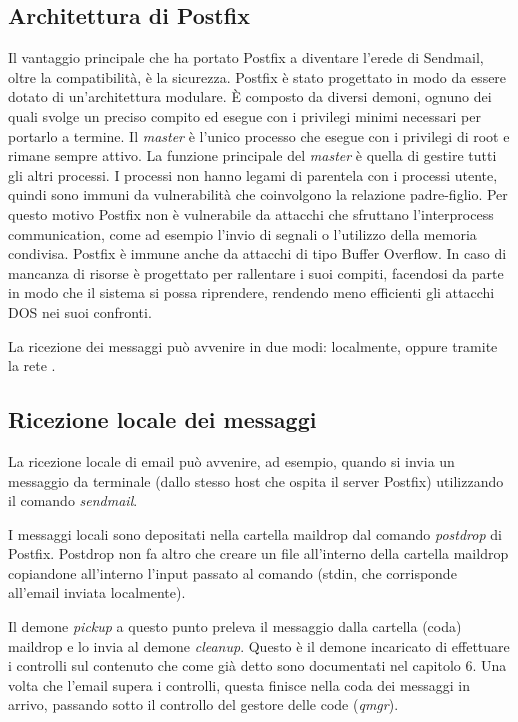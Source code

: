   \subsection{Architettura di Postfix}
  Il vantaggio principale che ha portato Postfix a diventare l’erede di Sendmail, oltre la compatibilità, 
  è la sicurezza. Postfix è stato progettato in modo da essere dotato di un’architettura modulare. 
  È composto da diversi demoni, ognuno dei quali svolge un preciso compito ed esegue con i privilegi minimi 
  necessari per portarlo a termine. Il  \textit{master} è l’unico processo che esegue con i privilegi di root
  e rimane sempre attivo. 
  La funzione principale del \textit{master} è quella di gestire tutti gli altri processi. 
  I processi non hanno legami di parentela con i processi utente, quindi sono immuni da vulnerabilità che 
  coinvolgono la relazione padre-figlio. Per questo motivo Postfix non è vulnerabile da attacchi che sfruttano 
  l’interprocess communication, come ad esempio l’invio di segnali o l’utilizzo della memoria condivisa. 
  Postfix è immune anche da attacchi di tipo Buffer Overflow. 
  In caso di mancanza di risorse è progettato per rallentare i suoi compiti, facendosi da parte in modo che 
  il sistema si possa riprendere, rendendo meno efficienti gli attacchi DOS nei suoi confronti.
  
  La ricezione dei messaggi può avvenire in due modi: localmente, oppure tramite la rete \cite{hildebrandt2005book}.
  
  \subsection{Ricezione locale dei messaggi}\label{sec:ricezioneLocale}
  La ricezione locale di email può avvenire, ad esempio, quando si invia un messaggio da terminale 
  (dallo stesso host che ospita il server Postfix) utilizzando il comando \textit{sendmail}. 
  
  I messaggi locali sono depositati nella cartella maildrop dal comando \textit{postdrop} di Postfix. 
  Postdrop non fa altro che creare un file all’interno della cartella maildrop copiandone all’interno 
  l’input passato al comando (stdin, che corrisponde all'email inviata localmente). 
  
  Il demone \textit{pickup} a questo punto preleva il messaggio dalla cartella (coda) maildrop e lo 
  invia al demone \textit{cleanup}. 
  Questo è il demone incaricato di effettuare i controlli sul contenuto che come già detto sono documentati 
  nel capitolo 6. 
  Una volta che l’email supera i controlli, questa finisce nella coda dei messaggi in arrivo, passando 
  sotto il controllo del gestore delle code (\textit{qmgr}).

